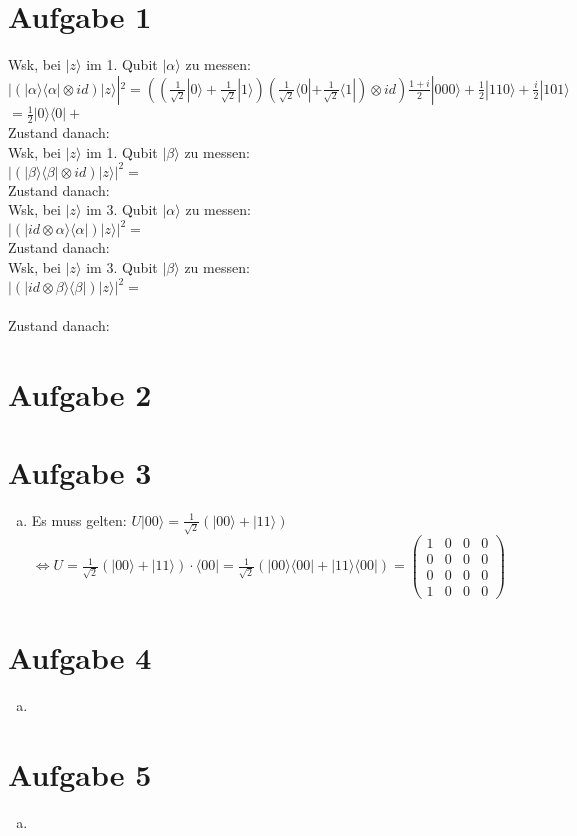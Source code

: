 \documentclass[a4paper]{scrartcl}
\begin{document}
\section*{Aufgabe 1}
Wsk, bei $|z\rangle$ im 1. Qubit $|\alpha\rangle$ zu messen:\\
$|(|\alpha\rangle\langle\alpha|\otimes id)|z\rangle|^2= ((\frac{1}{\sqrt{2}}|0\rangle+\frac{1}{\sqrt{2}}|1\rangle)(\frac{1}{\sqrt{2}}\langle 0|+\frac{1}{\sqrt{2}}\langle 1|)\otimes id )\frac{1+i}{2}|000\rangle+\frac{1}{2}|110\rangle+\frac{i}{2}|101\rangle$\\
$= \frac{1}{2}|0\rangle\langle 0|+$\\
Zustand danach:\\
Wsk, bei $|z\rangle$ im 1. Qubit $|\beta\rangle$ zu messen:\\
$|(|\beta\rangle\langle\beta|\otimes id)|z\rangle|^2= $\\
Zustand danach:\\
Wsk, bei $|z\rangle$ im 3. Qubit $|\alpha\rangle$ zu messen:\\
$|(|id\otimes\alpha\rangle\langle\alpha|)|z\rangle|^2= $\\
Zustand danach:\\
Wsk, bei $|z\rangle$ im 3. Qubit $|\beta\rangle$ zu messen:\\
$|(|id\otimes\beta\rangle\langle\beta|)|z\rangle|^2= $\\\\
Zustand danach:\\
\newpage
\section*{Aufgabe 2}


\newpage
\section*{Aufgabe 3}
\begin{enumerate}[a)]

\item Es muss gelten: $U |00\rangle=\frac{1}{\sqrt{2}}(|00\rangle + |11\rangle )$\\
$\Leftrightarrow U = \frac{1}{\sqrt{2}}(|00 \rangle + |11\rangle)\cdot \langle 00|= \frac{1}{\sqrt{2}}(|00\rangle \langle 00|+|11\rangle \langle 00|)= \begin{pmatrix}
1&0&0&0\\
0&0&0&0\\
0&0&0&0\\
1&0&0&0
\end{pmatrix}$
\end{enumerate}

\newpage
\section*{Aufgabe 4}
\begin{enumerate}[a)]

\item

\end{enumerate}
\newpage
\section*{Aufgabe 5}
\begin{enumerate}[a)]

\item
\end{enumerate}
\end{document}

